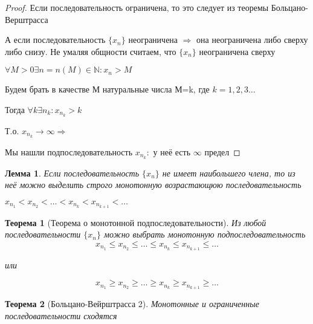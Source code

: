 \documentclass{book}
\newtheorem{Th}{Теорема}[chapter]
\newtheorem{Lm}{Лемма}[chapter]
\begin{document}
\begin{proof}
	Если последовательность  ограничена, то это следует из теоремы Больцано-Верштрасса
	
	А если последовательность $\{x_n\}$ неограничена $\Rightarrow$ она неограничена либо сверху либо снизу. Не умаляя общности считаем, что $\{x_n\}$ неограничена сверху
	
	$\forall M>0 \exists n = n(M)\in \mathds{N}: x_n >M$
	
	Будем брать в качестве М натуральные числа М=k, где $k = 1, 2, 3 \hdots$
	
	Тогда $\forall k \exists n_k: x_{n_k}>k$
	
	Т.о. $x_{n_k} \rightarrow \infty \Rightarrow$
	
	Мы нашли подпоследовательность $x_{n_k}:$ у неё есть $\infty$ предел
\end{proof}

\begin{Lm}
 Если последовательность $\{x_n\}$ не имеет наибольшего члена, то из неё можно выделить строго монотонную возрастающюю последовательность 
 
 $x_{n_1}<x_{n_2}<\hdots<x_{n_k}<x_{n_{k+1}}<\hdots$
\end{Lm}

\begin{Th}[Теорема о монотонной подпоследовательности]
Из любой последовательности $\{x_n\}$ можно выбрать монотонную подпоследовательность\\

$$x_{n_1}\leqslant x_{n_2}\leqslant \hdots\leqslant x_{n_k}\leqslant x_{n_{k+1}}\leqslant \hdots$$
\begin{center}
или
\end{center}
$$x_{n_1}\geqslant x_{n_2}\geqslant \hdots\geqslant x_{n_k}\geqslant x_{n_{k+1}}\geqslant \hdots$$
\end{Th}

\begin{Th}[Больцано-Вейрштрасса 2]
Монотонные и ограниченные последовательности сходятся
\end{Th}
\end{document}
